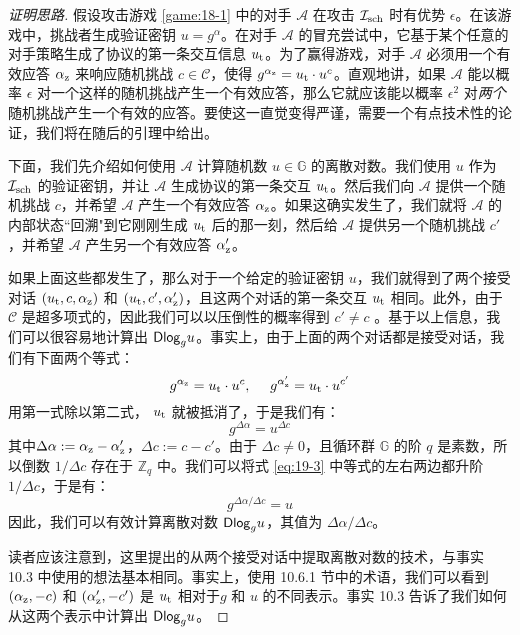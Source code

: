 \begin{proof}[证明思路]
假设攻击游戏 \ref{game:18-1} 中的对手 $\mathcal{A}$ 在攻击 $\mathcal{I}_{\rm sch}$ 时有优势 $\epsilon$。在该游戏中，挑战者生成验证密钥 $u=g^\alpha$。在对手 $\mathcal{A}$ 的冒充尝试中，它基于某个任意的对手策略生成了协议的第一条交互信息 $u_{\rm t}$。为了赢得游戏，对手 $\mathcal{A}$ 必须用一个有效应答 $\alpha_{\rm z}$ 来响应随机挑战 $c\in\mathcal{C}$，使得 $g^{\alpha_{\rm z}}=u_{\rm t}\cdot u^c$。直观地讲，如果 $\mathcal{A}$ 能以概率 $\epsilon$ 对一个这样的随机挑战产生一个有效应答，那么它就应该能以概率 $\epsilon^2$ 对\emph{两个}随机挑战产生一个有效的应答。要使这一直觉变得严谨，需要一个有点技术性的论证，我们将在随后的引理中给出。

下面，我们先介绍如何使用 $\mathcal{A}$ 计算随机数 $u\in\mathbb{G}$ 的离散对数。我们使用 $u$ 作为 $\mathcal{I}_{\rm sch}$ 的验证密钥，并让 $\mathcal{A}$ 生成协议的第一条交互 $u_{\rm t}$。然后我们向 $\mathcal{A}$ 提供一个随机挑战 $c$，并希望 $\mathcal{A}$ 产生一个有效应答 $\alpha_{\rm z}$。如果这确实发生了，我们就将 $\mathcal{A}$ 的内部状态``回溯"到它刚刚生成 $u_{\rm t}$ 后的那一刻，然后给 $\mathcal{A}$ 提供另一个随机挑战 $c'$，并希望 $\mathcal{A}$ 产生另一个有效应答 $\alpha_{\rm z}'$。

如果上面这些都发生了，那么对于一个给定的验证密钥 $u$，我们就得到了两个接受对话 $(u_{\rm t},c,\alpha_{\rm z})$ 和 $(u_{\rm t},c',\alpha_{\rm z}')$，且这两个对话的第一条交互 $u_{\rm t}$ 相同。此外，由于 $\mathcal{C}$ 是超多项式的，因此我们可以以压倒性的概率得到 $c'\neq c$ 。基于以上信息，我们可以很容易地计算出 ${\rm \mathsf{Dlog}}_gu$。事实上，由于上面的两个对话都是接受对话，我们有下面两个等式：
$$g^{\alpha_{\rm z}}=u_{\rm t}\cdot u^c,~~~~
g^{\alpha_{\rm z}'} =u_{\rm t}\cdot u^{c'}$$
用第一式除以第二式， $u_{\rm t}$ 就被抵消了，于是我们有：
\begin{equation}\label{eq:19-3}
	g^{\Delta\alpha}=u^{\Delta c}
\end{equation}
其中$\Delta\alpha:=\alpha_{\rm z}-\alpha_{\rm z}'$，$\Delta c:=c-c'$。由于 $\Delta c\neq 0$，且循环群 $\mathbb{G}$ 的阶 $q$ 是素数，所以倒数 ${1}/{\Delta c}$ 存在于 $\mathbb{Z}_q$ 中。我们可以将式 \ref{eq:19-3} 中等式的左右两边都升阶 ${1}/{\Delta c}$，于是有：
	$$g^{{\Delta\alpha}/{\Delta c}}=u$$
因此，我们可以有效计算离散对数 ${\rm \mathsf{Dlog}}_gu$，其值为 ${\Delta\alpha}/{\Delta c}$。

读者应该注意到，这里提出的从两个接受对话中提取离散对数的技术，与事实 10.3 中使用的想法基本相同。事实上，使用 10.6.1 节中的术语，我们可以看到 $(\alpha_{\rm z},-c)$ 和 $(\alpha_{\rm z}',-c')$ 是 $u_{\rm t}$ 相对于$g$ 和 $u$ 的不同表示。事实 10.3 告诉了我们如何从这两个表示中计算出 ${\rm \mathsf{Dlog}}_gu$。
\end{proof}

